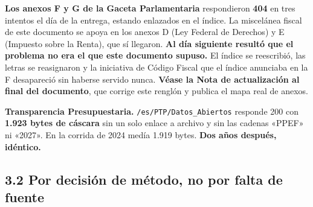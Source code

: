 \begin{list}{}{\setlength{\leftmargin}{1.4em}\setlength{\itemsep}{4pt}}
\item[$\bullet$] \textbf{Los anexos F y G de la Gaceta Parlamentaria} respondieron
\textbf{404} en tres intentos el día de la entrega, estando enlazados en el índice. La
miscelánea fiscal de este documento se apoya en los anexos D (Ley Federal de Derechos) y E
(Impuesto sobre la Renta), que sí llegaron. \textbf{Al día siguiente resultó que el problema
no era el que este documento supuso.} El índice se reescribió, las letras se reasignaron y la
iniciativa de Código Fiscal que el índice anunciaba en la F desapareció sin haberse servido
nunca. \textbf{Véase la Nota de actualización al final del documento}, que corrige este
renglón y publica el mapa real de anexos.

\item[$\bullet$] \textbf{Transparencia Presupuestaria.} \texttt{/es/PTP/Datos\_Abiertos}
responde 200 con \textbf{1.923 bytes de cáscara} sin un solo enlace a archivo y sin las
cadenas «PPEF» ni «2027». En la corrida de 2024 medía 1.919 bytes. \textbf{Dos años después,
idéntico.}
\end{list}

\subsection*{3.2 Por decisión de método, no por falta de fuente}

